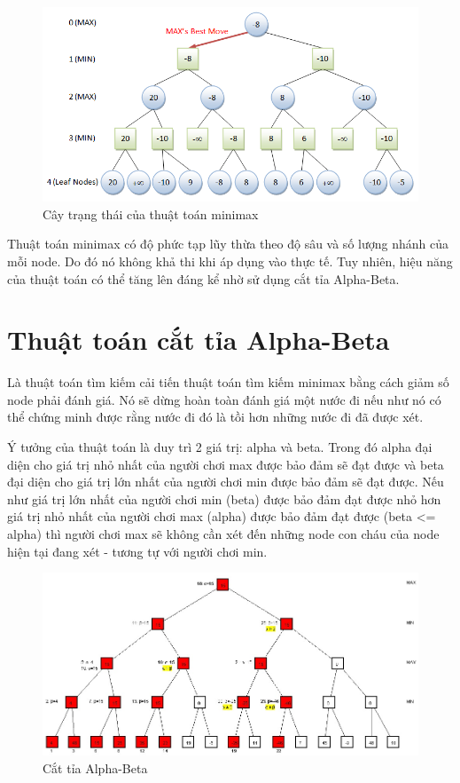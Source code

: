 \documentclass[12pt]{report}
\begin{document}
\begin{figure}[H]
\caption{Cây trạng thái của thuật toán minimax}
\includegraphics[width=\textwidth]{minimax.png}
\end{figure}

Thuật toán minimax có độ phức tạp lũy thừa theo độ sâu và số lượng nhánh của mỗi node. Do đó nó không khả thi khi áp dụng vào thực tế. 
Tuy nhiên, hiệu năng của thuật toán có thể tăng lên đáng kể nhờ sử dụng cắt tỉa Alpha-Beta. 

\section{Thuật toán cắt tỉa Alpha-Beta}
Là thuật toán tìm kiếm cải tiến thuật toán tìm kiếm minimax bằng cách giảm số node phải đánh giá. 
Nó sẽ dừng hoàn toàn đánh giá một nước đi nếu như nó có thể chứng minh được rằng nước đi đó là tồi hơn những nước đi đã được xét. 

Ý tưởng của thuật toán là duy trì 2 giá trị: alpha và beta.
Trong đó alpha đại diện cho giá trị nhỏ nhất của người chơi max được bảo đảm sẽ đạt được và beta đại diện cho giá trị lớn nhất của người chơi min được bảo đảm sẽ đạt được. 
Nếu như giá trị lớn nhất của người chơi min (beta) được bảo đảm đạt được nhỏ hơn giá trị 
nhỏ nhất của người chơi max (alpha) được bảo đảm đạt được (beta <= alpha) thì người chơi max 
sẽ không cần xét đến những node con cháu của node hiện tại đang xét - tương tự với người chơi min. 

\begin{figure}[H]
\caption{Cắt tỉa Alpha-Beta}
\includegraphics[width=\textwidth]{alpha-beta.jpg}
\end{figure}
\end{document}
